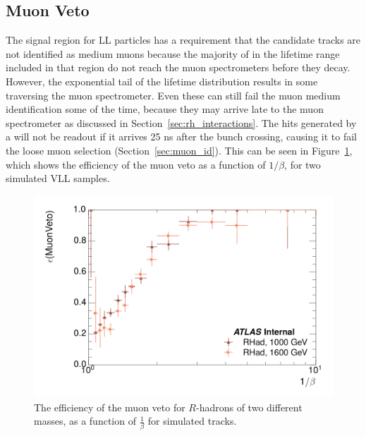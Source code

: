 \subsection{Muon Veto}
The signal region for \ac{LL} particles has a requirement that the candidate tracks are not identified as medium muons because the majority of \rhadrons in the lifetime range included in that region do not reach the muon spectrometers before they decay. 
However, the exponential tail of the \rhadron lifetime distribution results in some \rhadrons traversing the muon spectrometer. 
Even these \rhadrons can still fail the muon medium identification some of the time, because they may arrive late to the muon spectrometer as discussed in Section~\ref{sec:rh_interactions}.
The hits generated by a \rhadron will not be readout if it arrives 25 ns after the bunch crossing, causing it to fail the loose muon selection (Section~\ref{sec:muon_id}).
This can be seen in Figure~\ref{fig:muonVeto_eff}, which shows the efficiency of the muon veto as a function of $1/\beta$, for two simulated \ac{VLL} \rhadron samples.

\begin{figure}[hbtp]
\centering
\includegraphics[width=\fullfig]{figures/veff_invbeta.png}
\caption{The efficiency of the muon veto for $R$-hadrons of two different masses, as a function of $\frac{1}{\beta}$ for simulated \rhadron tracks.}
\label{fig:muonVeto_eff}
\end{figure}

